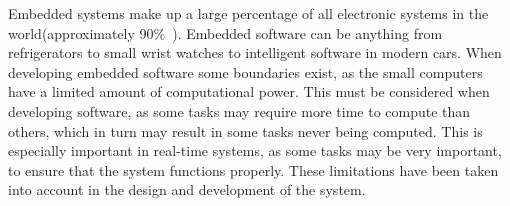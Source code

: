 Embedded systems make up a large percentage of all electronic systems in the world(approximately 90\%~\citep{embedded_software_number}). Embedded software can be anything from refrigerators to small wrist watches to intelligent software in modern cars. When developing embedded software some boundaries exist, as the small computers have a limited amount of computational power. This must be considered when developing software, as some tasks may require more time to compute than others, which in turn may result in some tasks never being computed. This is especially important in real-time systems, as some tasks may be very important, to ensure that the system functions properly. These limitations have been taken into account in the design and development of the \projname{} system. 
